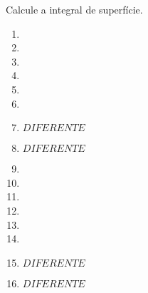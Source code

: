 



	
	
	\vspace{5mm}
	
	Calcule a integral de superfície.
	
	\begin{enumerate}
		
		\item
		\resposta{}

		\item
		\resposta{}

		\item
		\resposta{}

		\item
		\resposta{}

		\item
		\resposta{}

		\item
		\resposta{}

		\item $DIFERENTE$

		\item $DIFERENTE$

		\item
		\resposta{}

		\item
		\resposta{}

		\item
		\resposta{}

		\item
		\resposta{}

		\item
		\resposta{}

		\item
		\resposta{}

		\item $DIFERENTE$

		\item $DIFERENTE$
	
	\end{enumerate}
	
	\vspace{5mm}
	
